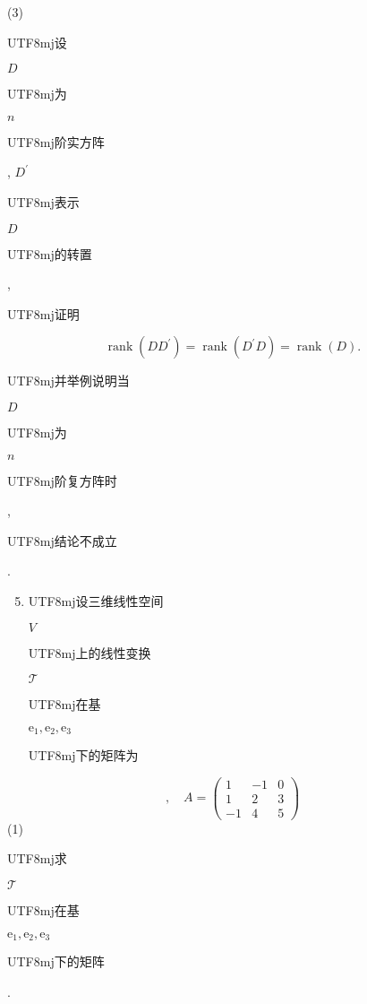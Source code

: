 \documentclass[10pt]{article}
\begin{document}
(3) \begin{CJK}{UTF8}{mj}设\end{CJK} $D$ \begin{CJK}{UTF8}{mj}为\end{CJK} $n$ \begin{CJK}{UTF8}{mj}阶实方阵\end{CJK}, $D^{\prime}$ \begin{CJK}{UTF8}{mj}表示\end{CJK} $D$ \begin{CJK}{UTF8}{mj}的转置\end{CJK}, \begin{CJK}{UTF8}{mj}证明\end{CJK}
$$
\operatorname{rank}\left(D D^{\prime}\right)=\operatorname{rank}\left(D^{\prime} D\right)=\operatorname{rank}(D) .
$$
\begin{CJK}{UTF8}{mj}并举例说明当\end{CJK} $D$ \begin{CJK}{UTF8}{mj}为\end{CJK} $n$ \begin{CJK}{UTF8}{mj}阶复方阵时\end{CJK}, \begin{CJK}{UTF8}{mj}结论不成立\end{CJK}.

\begin{enumerate}
  \setcounter{enumi}{4}
  \item \begin{CJK}{UTF8}{mj}设三维线性空间\end{CJK} $V$ \begin{CJK}{UTF8}{mj}上的线性变换\end{CJK} $\mathscr{T}$ \begin{CJK}{UTF8}{mj}在基\end{CJK} $\mathrm{e}_{1}, \mathrm{e}_{2}, \mathrm{e}_{3}$ \begin{CJK}{UTF8}{mj}下的矩阵为\end{CJK}
\end{enumerate}
$$
, \quad A=\left(\begin{array}{ccc}
1 & -1 & 0 \\
1 & 2 & 3 \\
-1 & 4 & 5
\end{array}\right)
$$
(1) \begin{CJK}{UTF8}{mj}求\end{CJK} $\mathscr{T}$ \begin{CJK}{UTF8}{mj}在基\end{CJK} $\mathrm{e}_{1}, \mathrm{e}_{2}, \mathrm{e}_{3}$ \begin{CJK}{UTF8}{mj}下的矩阵\end{CJK}.
\end{document}
